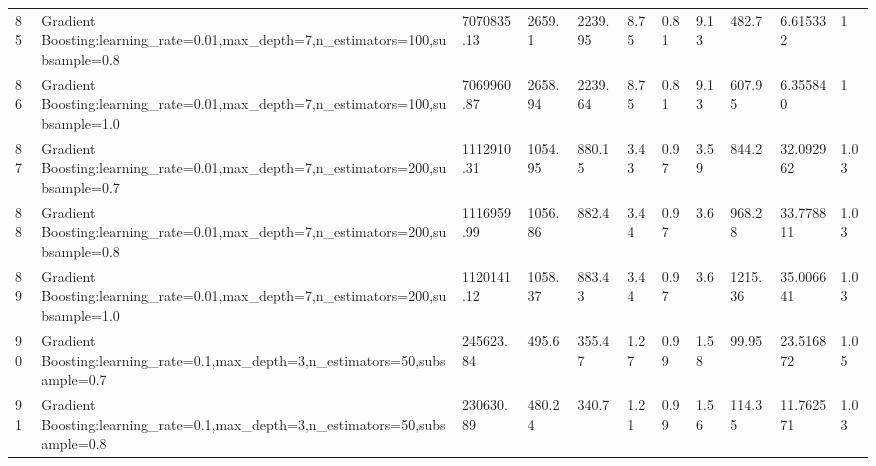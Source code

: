 \begin{longtable}{C{0.8cm} L{2cm} C{1.15cm} C{1.15cm} C{1.15cm} C{1.15cm} C{0.85cm} C{1.25cm} C{1.2cm} C{1.5cm} C{1.0cm}}
85 & Gradient Boosting:\newline learning\_rate=0.01,\newline max\_depth=7,\newline n\_estimators=100,\newline subsample=0.8 & 7070835.13 & 2659.1 & 2239.95 & 8.75 & 0.81 & 9.13 & 482.7 & 6.615332 & 1 \\
86 & Gradient Boosting:\newline learning\_rate=0.01,\newline max\_depth=7,\newline n\_estimators=100,\newline subsample=1.0 & 7069960.87 & 2658.94 & 2239.64 & 8.75 & 0.81 & 9.13 & 607.95 & 6.355840 & 1 \\
87 & Gradient Boosting:\newline learning\_rate=0.01,\newline max\_depth=7,\newline n\_estimators=200,\newline subsample=0.7 & 1112910.31 & 1054.95 & 880.15 & 3.43 & 0.97 & 3.59 & 844.2 & 32.092962 & 1.03 \\
88 & Gradient Boosting:\newline learning\_rate=0.01,\newline max\_depth=7,\newline n\_estimators=200,\newline subsample=0.8 & 1116959.99 & 1056.86 & 882.4 & 3.44 & 0.97 & 3.6 & 968.28 & 33.778811 & 1.03 \\
89 & Gradient Boosting:\newline learning\_rate=0.01,\newline max\_depth=7,\newline n\_estimators=200,\newline subsample=1.0 & 1120141.12 & 1058.37 & 883.43 & 3.44 & 0.97 & 3.6 & 1215.36 & 35.006641 & 1.03 \\
90 & Gradient Boosting:\newline learning\_rate=0.1,\newline max\_depth=3,\newline n\_estimators=50,\newline subsample=0.7 & 245623.84 & 495.6 & 355.47 & 1.27 & 0.99 & 1.58 & 99.95 & 23.516872 & 1.05 \\
91 & Gradient Boosting:\newline learning\_rate=0.1,\newline max\_depth=3,\newline n\_estimators=50,\newline subsample=0.8 & 230630.89 & 480.24 & 340.7 & 1.21 & 0.99 & 1.56 & 114.35 & 11.762571 & 1.03 \\

\end{longtable}
